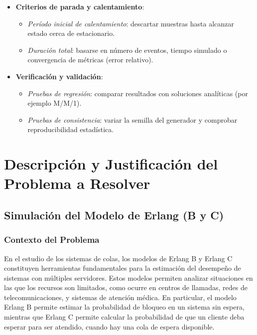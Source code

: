 \documentclass{article}
\begin{document}
\begin{itemize}
    \item \textbf{Criterios de parada y calentamiento}:  
    \begin{itemize}
        \item \emph{Período inicial de calentamiento}: descartar muestras hasta alcanzar estado cerca de estacionario.
        \item \emph{Duración total}: basarse en número de eventos, tiempo simulado o convergencia de métricas (error relativo).
    \end{itemize}

    \item \textbf{Verificación y validación}:  
    \begin{itemize}
        \item \emph{Pruebas de regresión}: comparar resultados con soluciones analíticas (por ejemplo M/M/1).
        \item \emph{Pruebas de consistencia}: variar la semilla del generador y comprobar reproducibilidad estadística.
    \end{itemize}
\end{itemize}


\section{Descripción y Justificación del Problema a Resolver}\label{sec:descr}


\subsection{Simulación del Modelo de Erlang (B y C)}\label{subsec:erlang}

\subsubsection{Contexto del Problema}

En el estudio de los sistemas de colas, los modelos de Erlang B y Erlang C constituyen herramientas fundamentales para la estimación del desempeño de sistemas con múltiples servidores. Estos modelos permiten analizar situaciones en las que los recursos son limitados, como ocurre en centros de llamadas, redes de telecomunicaciones, y sistemas de atención médica. En particular, el modelo Erlang B permite estimar la probabilidad de bloqueo en un sistema sin espera, mientras que Erlang C permite calcular la probabilidad de que un cliente deba esperar para ser atendido, cuando hay una cola de espera disponible.
\end{document}

